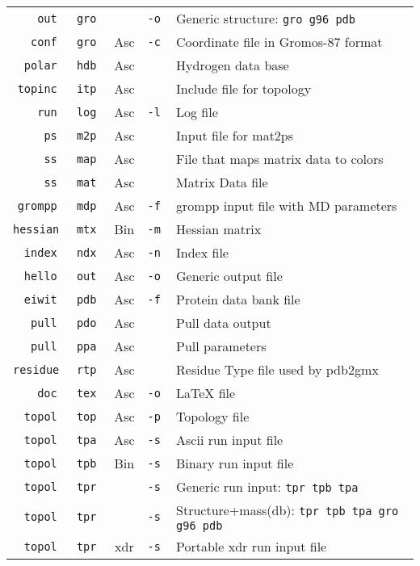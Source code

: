 \begin{table}
\begin{tabularx}{\linewidth}{|r@{\tt.}lccX|}
\tt      out & \tt gro &     & \tt -o & Generic structure: \tt gro g96 pdb \\[-0.1ex]
\tt     conf & \tt gro & Asc & \tt -c & Coordinate file in Gromos-87 format \\[-0.1ex]
\tt    polar & \tt hdb & Asc & \tt    & Hydrogen data base \\[-0.1ex]
\tt   topinc & \tt itp & Asc & \tt    & Include file for topology \\[-0.1ex]
\tt      run & \tt log & Asc & \tt -l & Log file \\[-0.1ex]
\tt       ps & \tt m2p & Asc & \tt    & Input file for mat2ps \\[-0.1ex]
\tt       ss & \tt map & Asc & \tt    & File that maps matrix data to colors \\[-0.1ex]
\tt       ss & \tt mat & Asc & \tt    & Matrix Data file \\[-0.1ex]
\tt   grompp & \tt mdp & Asc & \tt -f & grompp input file with MD parameters \\[-0.1ex]
\tt  hessian & \tt mtx & Bin & \tt -m & Hessian matrix \\[-0.1ex]
\tt    index & \tt ndx & Asc & \tt -n & Index file \\[-0.1ex]
\tt    hello & \tt out & Asc & \tt -o & Generic output file \\[-0.1ex]
\tt    eiwit & \tt pdb & Asc & \tt -f & Protein data bank file \\[-0.1ex]
\tt     pull & \tt pdo & Asc & \tt    & Pull data output \\[-0.1ex]
\tt     pull & \tt ppa & Asc & \tt    & Pull parameters \\[-0.1ex]
\tt  residue & \tt rtp & Asc & \tt    & Residue Type file used by pdb2gmx \\[-0.1ex]
\tt      doc & \tt tex & Asc & \tt -o & LaTeX file \\[-0.1ex]
\tt    topol & \tt top & Asc & \tt -p & Topology file \\[-0.1ex]
\tt    topol & \tt tpa & Asc & \tt -s & Ascii run input file \\[-0.1ex]
\tt    topol & \tt tpb & Bin & \tt -s & Binary run input file \\[-0.1ex]
\tt    topol & \tt tpr &     & \tt -s & Generic run input: \tt tpr tpb tpa \\[-0.1ex]
\tt    topol & \tt tpr &     & \tt -s & Structure+mass(db): \tt tpr tpb tpa gro g96 pdb \\[-0.1ex]
\tt    topol & \tt tpr & xdr & \tt -s & Portable xdr run input file \\[-0.1ex]

\end{tabularx}
\end{table}
